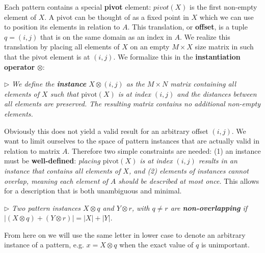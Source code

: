 \documentclass{llncs}
\begin{document}
Each pattern contains a special \textbf{pivot} element: %
$pivot(X)$ is the first non-empty element of $X$. %
\noindent
A pivot can be thought of as a fixed point in $X$ which we can use to position its elements in relation to $A$. This translation, or \textbf{offset}, is a tuple ${q}=(i,j)$ that is on the same domain as an index in $A$. We realize this translation by placing all elements of $X$ on an empty $M\times X$ size matrix in such that the pivot element is at $(i,j)$. We formalize this in the \textbf{instantiation operator} $\otimes$:

\smallskip
\noindent $\triangleright$
\emph{We define the \textbf{instance} $X \otimes {(i,j)}$ as the $M\times N$ matrix containing all elements of $X$ such that $\mathrm{pivot}(X)$ is at index $(i,j)$ and the distances between all elements are preserved. The resulting matrix contains no additional non-empty elements. } %
\smallskip

Obviously this does not yield a valid result for an arbitrary offset $(i,j)$. We want to limit ourselves to the space of pattern instances that are actually valid in relation to matrix $A$. Therefore two simple constraints are needed: (1) an instance must be \textbf{well-defined}: \emph{placing $\mathrm{pivot}(X)$ is at index $(i,j)$ results in an instance that contains all elements of $X$, and (2) elements of instances cannot overlap, meaning each element of $A$ should be described at most once.} This allows for a description that is both unambiguous and minimal.

\smallskip
\noindent $\triangleright$
\emph{Two pattern instances $X \otimes {q}$ and $Y \otimes {r}$, with ${q} \neq {r}$ are \textbf{non-overlapping} if $|(X \otimes {q}) + (Y \otimes {r})| = |X|+|Y|$.}
\smallskip

From here on we will use the same letter in lower case to denote an arbitrary instance of a pattern, e.g. $x = X \otimes {q}$ when the exact value of ${q}$ is unimportant.%
\end{document}
